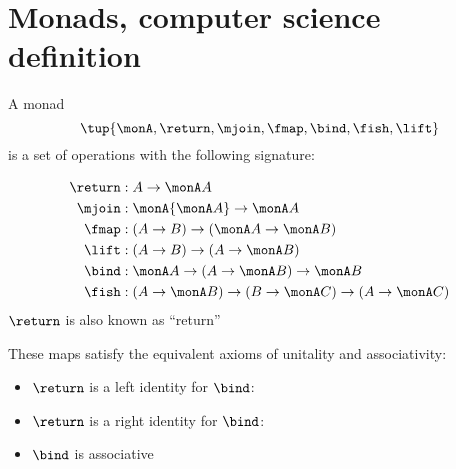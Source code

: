 

\section{Monads, computer science definition}
\label{sec:monads-CS}


\begin{definition}\label{def:monad-computer-science}
  A monad \begin{equation}
    \tup{ \monA,\return,\mjoin,\fmap,\bind,\fish,\lift} 
  \end{equation}
  is a set of operations with the following signature:
  
  \begin{align*}
  \return & :A\to\monA A\\
  \mjoin & :\monA{\monA A}\to\monA A\\
  \fmap & :(A\to B)\to(\monA A\to\monA B)\\
  \lift & :(A\to B)\to( A\to\monA B)\\
  \bind & :\monA A\to(A\to\monA B)\to\monA B\\
  \fish & :(A\to\monA B)\to(B\to\monA C)\to(A\to\monA C)
  \end{align*}
  $\return$ is also known as ``return''
  
  These maps satisfy the equivalent axioms of unitality and associativity:
  \begin{itemize}
  \item $\return$ is a left identity for $\bind$:
  
  \item $\return$ is a right identity for $\bind$:
  
  \item $\bind$ is associative
  
  \end{itemize}
\end{definition}